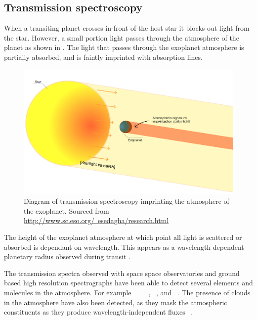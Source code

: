 


\subsection{Transmission spectroscopy}
When a transiting planet crosses in-front of the host star it blocks out light from the star. However, a small portion light passes through the atmosphere of the planet as shown in . The light that passes through the exoplanet atmosphere is partially absorbed, and is faintly imprinted with absorption lines.
\begin{figure}
    \centering
    \includegraphics[width=0.7\linewidth]{figures/introduction/transmission_spectroscopy}
    \caption{Diagram of transmission spectroscopy imprinting the atmosphere of the exoplanet. Sourced from \href{http://www.sc.eso.org/~esedagha/research.html}{http://www.sc.eso.org/~esedagha/research.html}}
    \label{fig:transmissionspectroscopy}
\end{figure}

The height of the exoplanet atmosphere at which point all light is scattered or absorbed is dependant on wavelength. This appears as a wavelength dependent planetary radius observed during transit \citep[e.g.][]{knutson_using_2007}.


The transmission spectra observed with space space observatories and ground based high resolution spectrographs have been able to detect several elements and molecules in the atmosphere. For example ~\citep{charbonneau_detection_2001} ~\cite{Tinette 2007, brogi_carbon_2014} ~\citep{snellen_mass_2018}, ~\citep{Redfield2008, wyttenbach 2015},  and ~\citep{hoeijmakers_atomic_2018}.
The presence of clouds in the atmosphere have also been detected, as they mask the atmospheric constituents as they produce wavelength-independent fluxes ~\citep[e.g.][]{barman 2011, line 2016,sing 2016}.


